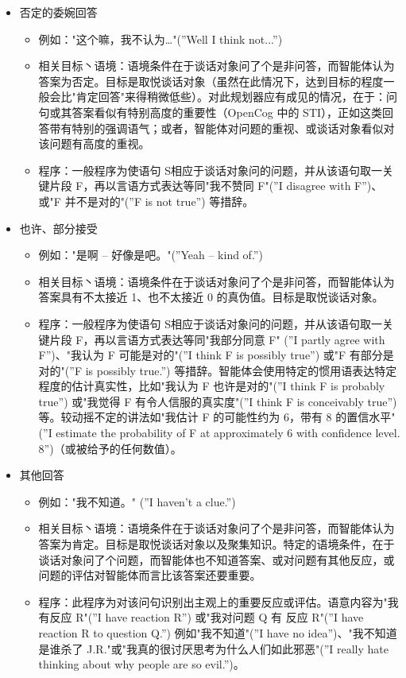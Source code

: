 \begin{itemize}
\item 否定的委婉回答
\begin{itemize}
\item 例如："这个嘛，我不认为…"(”Well I think not...”)
\item 相关目标丶语境：语境条件在于谈话对象问了个是非问答，而智能体认为答案为否定。目标是取悦谈话对象（虽然在此情况下，达到目标的程度一般会比"肯定回答"来得稍微低些）。对此规划器应有成见的情况，在于：问句或其答案看似有特别高度的重要性（OpenCog 中的 STI），正如这类回答带有特别的强调语气；或者，智能体对问题的重视、或谈话对象看似对该问题有高度的重视。
\item 程序：一般程序为使语句 S相应于谈话对象问的问题，并从该语句取一关键片段 F，再以言语方式表达等同"我不赞同 F"(”I disagree with F”)、或"F 并不是对的"(”F is not true”) 等措辞。
\end{itemize}


\item 也许、部分接受
\begin{itemize}
\item 例如："是啊 – 好像是吧。"(”Yeah – kind of.”)
\item 相关目标丶语境：语境条件在于谈话对象问了个是非问答，而智能体认为答案具有不太接近 1、也不太接近 0 的真伪值。目标是取悦谈话对象。 
\item 程序：一般程序为使语句 S相应于谈话对象问的问题，并从该语句取一关键片段 F，再以言语方式表达等同"我部分同意 F" (”I partly agree with F”)、"我认为 F 可能是对的"(”I think F is possibly true”) 或"F 有部分是对的"(”F is possibly true.”) 等措辞。智能体会使用特定的惯用语表达特定程度的估计真实性，比如"我认为 F 也许是对的"(”I think F is probably true”) 或"我觉得 F 有令人信服的真实度"(”I think F is conceivably true”) 等。较动摇不定的讲法如"我估计 F 的可能性约为 6，带有 8 的置信水平"(”I estimate the probability of F at approximately 6 with confidence level. 8”)（或被给予的任何数值）。
\end{itemize}


\item 其他回答
\begin{itemize}
\item 例如："我不知道。" (”I haven’t a clue.”) 
\item 相关目标丶语境：语境条件在于谈话对象问了个是非问答，而智能体认为答案为肯定。目标是取悦谈话对象以及聚集知识。特定的语境条件，在于谈话对象问了个问题，而智能体也不知道答案、或对问题有其他反应，或问题的评估对智能体而言比该答案还要重要。
\item 程序：此程序为对该问句识别出主观上的重要反应或评估。语意内容为"我有反应 R"(”I have reaction R”) 或"我对问题 Q 有 反应 R"(”I have reaction R to question Q.”) 例如"我不知道"(”I have no idea”)、"我不知道是谁杀了 J.R."或"我真的很讨厌思考为什么人们如此邪恶"(”I really hate thinking about why people are so evil.”)。
\end{itemize}



\end{itemize}

